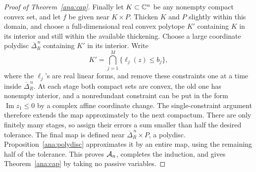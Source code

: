 \begin{proof}[Proof of Theorem~\ref{ana:cap}]
Finally let \(K\subset\mathbb C^n\) be any nonempty compact convex set,
and let \(f\) be given near \(K\times P\).
Thicken \(K\) and \(P\) slightly within this domain, and choose
a full-dimensional real convex polytope \(K'\) containing \(K\)
in its interior and still within the available thickening.
Choose a large coordinate polydisc \(\overline\Delta_R^{\,n}\)
containing \(K'\) in its interior.  Write
\[
 K'=\bigcap_{j=1}^M\{\ell_j(z)\leq b_j\},
\]
where the \(\ell_j\)'s are real linear forms, and remove these
constraints one at a time inside
\(\overline\Delta_R^{\,n}\).
At each stage both compact sets are convex, the old one has
nonempty interior, and a nonredundant constraint can be put
in the form \(\operatorname{Im}z_1\leq0\) by a complex affine
coordinate change.  The single-constraint argument therefore
extends the map approximately to the next compactum.
There are only finitely many stages, so assign their errors
a sum smaller than half the desired tolerance.
The final map is defined near
\(\overline\Delta_R^{\,n}\times P\), a polydisc.
Proposition~\ref{ana:polydisc} approximates it by an entire map,
using the remaining half of the tolerance.
This proves \({\cal A}_n\), completes the induction, and gives
Theorem~\ref{ana:cap} by taking no passive variables.
\end{proof}
